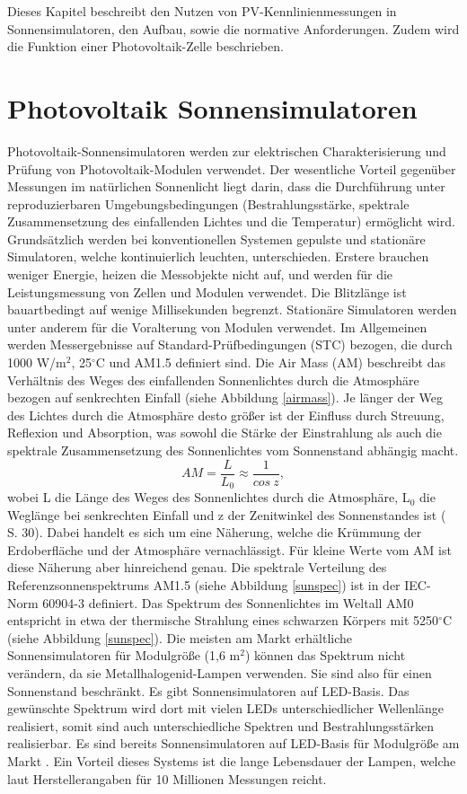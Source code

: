 \documentclass[a4paper,bibtotoc,oneside]{scrbook}
\begin{document}
Dieses Kapitel beschreibt den Nutzen von PV-Kennlinienmessungen in Sonnensimulatoren, den Aufbau, sowie die normative Anforderungen. Zudem wird die Funktion einer Photovoltaik-Zelle beschrieben.

\section{Photovoltaik Sonnensimulatoren} \thispagestyle{empty}

Photovoltaik-Sonnensimulatoren werden zur elektrischen Charakterisierung und Prüfung von Photovoltaik-Modulen verwendet. Der wesentliche Vorteil gegenüber Messungen im natürlichen Sonnenlicht liegt darin, dass die Durchführung unter reproduzierbaren Umgebungsbedingungen (Bestrahlungsstärke, spektrale Zusammensetzung des einfallenden Lichtes und die Temperatur)  ermöglicht wird. Grundsätzlich werden bei konventionellen Systemen gepulste und stationäre Simulatoren, welche kontinuierlich leuchten, unterschieden. Erstere brauchen weniger Energie, heizen die Messobjekte nicht auf, und werden für die Leistungsmessung von Zellen und Modulen verwendet. Die Blitzlänge ist bauartbedingt auf wenige Millisekunden begrenzt. Stationäre Simulatoren werden unter anderem für die Voralterung von Modulen verwendet.
Im Allgemeinen werden Messergebnisse auf Standard-Prüfbedingungen (STC) bezogen, die durch 1000 W/m$^2$, 25$^{\circ}$C und AM1.5 definiert sind. Die Air Mass (AM) beschreibt das Verhältnis des Weges des einfallenden Sonnenlichtes durch die Atmosphäre bezogen auf senkrechten Einfall (siehe Abbildung \ref{airmass}). Je länger der Weg des Lichtes durch die Atmosphäre desto größer ist der Einfluss durch Streuung, Reflexion und Absorption, was sowohl die Stärke der Einstrahlung als auch die spektrale Zusammensetzung des Sonnenlichtes vom Sonnenstand abhängig macht. 
\begin{equation}
     AM = \frac {L} {L_0} \approx \frac{1}{cos~ z},
\end{equation}
wobei L die Länge des Weges des Sonnenlichtes durch die Atmosphäre, L$_0$ die Weglänge bei senkrechten Einfall und z der Zenitwinkel des Sonnenstandes ist (\cite{wurf} S. 30). Dabei handelt es sich um eine Näherung, welche die Krümmung der Erdoberfläche und der Atmosphäre vernachlässigt. Für kleine Werte vom AM ist diese Näherung aber hinreichend genau.
Die spektrale Verteilung des Referenzsonnenspektrums AM1.5 (siehe Abbildung \ref{sunspec}) ist in der IEC-Norm 60904-3 \cite{norm3} definiert. Das Spektrum des Sonnenlichtes im Weltall AM0 entspricht in etwa der thermische Strahlung eines schwarzen Körpers mit 5250$^\circ$C (siehe Abbildung \ref{sunspec}).
Die meisten am Markt erhältliche Sonnensimulatoren für Modulgröße (1,6 m$^2$) können das Spektrum nicht verändern, da sie Metallhalogenid-Lampen verwenden. Sie sind also für einen Sonnenstand beschränkt. Es gibt Sonnensimulatoren auf LED-Basis. Das gewünschte Spektrum wird dort mit vielen LEDs unterschiedlicher Wellenlänge realisiert, somit sind auch unterschiedliche Spektren und Bestrahlungsstärken realisierbar. Es sind  bereits Sonnensimulatoren auf LED-Basis für Modulgröße am Markt \cite{mps}. Ein Vorteil dieses Systems ist die lange Lebensdauer der Lampen, welche laut Herstellerangaben für 10 Millionen Messungen reicht. 
\end{document}
